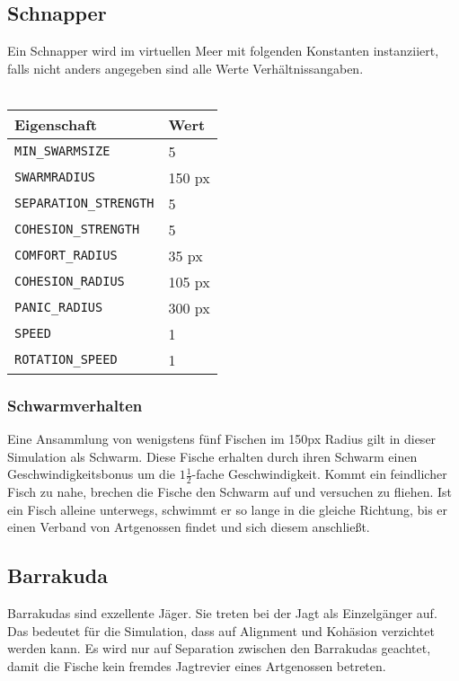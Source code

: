 \documentclass[11pt]{article}
\begin{document}
\subsection{Schnapper}
Ein Schnapper wird im virtuellen Meer mit folgenden Konstanten instanziiert, falls nicht anders angegeben sind alle Werte Verhältnissangaben. \\\\
\begin{tabular}{|l|l|}
\hline
	\textbf{Eigenschaft} & \textbf{Wert}\\
\hline
\hline
	\lstinline[]$MIN_SWARMSIZE$  & 5\\
\hline
	\lstinline[]$SWARMRADIUS$ & 150 px\\
\hline
	\lstinline[]$SEPARATION_STRENGTH$ & 5\\
\hline
	\lstinline[]$COHESION_STRENGTH$ & 5\\
\hline
	\lstinline[]$COMFORT_RADIUS$ & 35 px\\
\hline
	\lstinline[]$COHESION_RADIUS$ & 105 px\\
\hline
	\lstinline[]$PANIC_RADIUS$ & 300 px\\
\hline
	\lstinline[]$SPEED$ & 1\\
\hline
	\lstinline[]$ROTATION_SPEED$ & 1\\
\hline
\end{tabular}

\subsubsection{Schwarmverhalten}
Eine Ansammlung von wenigstens fünf Fischen im 150px Radius gilt in dieser Simulation als Schwarm. Diese Fische erhalten durch ihren Schwarm einen Geschwindigkeitsbonus um die \( 1 \frac{1}{2} \)-fache Geschwindigkeit.
Kommt ein feindlicher Fisch zu nahe, brechen die Fische den Schwarm auf und versuchen zu fliehen. Ist ein Fisch alleine unterwegs, schwimmt er so lange in die gleiche Richtung, bis er einen Verband von Artgenossen findet und sich diesem anschließt.

\subsection{Barrakuda}
Barrakudas sind exzellente Jäger. Sie treten bei der Jagt als Einzelgänger auf. Das bedeutet für die Simulation, dass auf Alignment und Kohäsion verzichtet werden kann. Es wird nur auf Separation zwischen den Barrakudas geachtet, damit die Fische kein fremdes Jagtrevier eines Artgenossen betreten.\\
\end{document}
